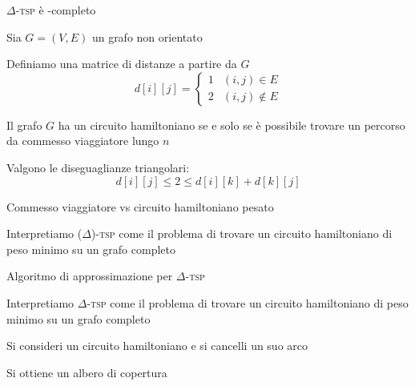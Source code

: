\begin{frame}{$\Delta$-\textsc{tsp} è \NP-completo}

\vspace{-9pt}
\BIL
\item Sia $G=(V,E)$ un grafo non orientato 
\item Definiamo una matrice di distanze a partire da $G$
\medskip
\[
  d[i][j] = \begin{cases}
    1 & (i,j) \in E \\
    2 & (i,j) \notin E
  \end{cases}
\]    

\item Il grafo $G$ ha un circuito hamiltoniano se e solo se è possibile
trovare un percorso da commesso viaggiatore lungo $n$
\item Valgono le diseguaglianze triangolari: 
\medskip
\[
  d[i][j] \leq 2 \leq d[i][k]+d[k][j]
\]
\EIL
\end{frame}

\begin{frame}{Commesso viaggiatore vs circuito hamiltoniano pesato}


\vspace{-9pt}
\BIL
\item Interpretiamo ($\Delta$)-\textsc{tsp} come il problema di trovare
un circuito hamiltoniano di peso minimo su un grafo completo
\EIL

\end{frame}


\begin{frame}{Algoritmo di approssimazione per $\Delta$-\textsc{tsp}}

\vspace{-9pt}
\BIL
\item Interpretiamo $\Delta$-\textsc{tsp} come il problema di trovare
un circuito hamiltoniano di peso minimo su un grafo completo
\item Si consideri un circuito hamiltoniano e si cancelli un suo arco
\item Si ottiene un albero di copertura
\EIL

\medskip
{}

\end{frame}

